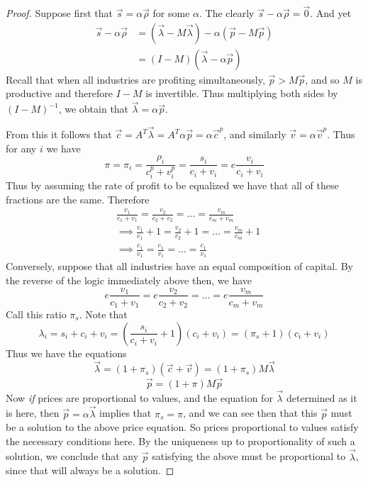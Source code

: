 \documentclass{article}
\theoremstyle{definition}
\theoremstyle{plain}
\theoremstyle{theorem}
\begin{document}
\begin{proof}
	Suppose first that $\vec{s} = \alpha\vec{\rho}$ for some $\alpha$. The clearly $\vec{s} - \alpha\vec{\rho} = \vec{0}$. And yet
	\begin{align*}
		\vec{s} - \alpha\vec{\rho} &= (\vec{\lambda} - M\vec{\lambda}) - \alpha(\vec{p} - M\vec{p}) \\
		&= (I-M)(\vec{\lambda} - \alpha\vec{p})
	\end{align*}
Recall that when all industries are profiting simultaneously, $\vec{p} > M\vec{p}$, and so $M$ is productive and therefore $I-M$ is invertible. Thus multiplying both sides by $(I-M)^{-1}$, we obtain that $\vec{\lambda} = \alpha\vec{p}$. \par 
From this it follows that $\vec{c} = A^T\vec{\lambda} = A^T\alpha\vec{p} = \alpha\vec{c}^p$, and similarly $\vec{v} = \alpha\vec{v}^p$. Thus for any $i$ we have
\[ \pi = \pi_i = \frac{\rho_i}{c_i^p + v_i^p} = \frac{s_i}{c_i+v_i} = e\frac{v_i}{c_i+v_i} \]
Thus by assuming the rate of profit to be equalized we have that all of these fractions are the same. Therefore 
\begin{align*}
	& \frac{v_1}{c_1+v_1} = \frac{v_2}{c_2+v_2} = \ldots = \frac{v_m}{c_m+v_m} \\
	&\implies \frac{v_1}{c_1}+1 = \frac{v_2}{c_2}+1 = \ldots = \frac{v_m}{c_m}+1 \\
	&\implies \frac{c_1}{v_1} = \frac{c_1}{v_1} = \ldots = \frac{c_1}{v_1}
\end{align*}
Conversely, suppose that all industries have an equal composition of capital. By the reverse of the logic immediately above then, we have
\[ e\frac{v_1}{c_1+v_1} = e\frac{v_2}{c_2+v_2} = \ldots = e\frac{v_m}{c_m+v_m} \]
Call this ratio $\pi_s$. Note that
\[ \lambda_i = s_i + c_i + v_i = (\frac{s_i}{c_i+v_i} + 1)(c_i+v_i) = (\pi_s+1)(c_i+v_i) \]
Thus we have the equations
\[ \vec{\lambda} = (1+\pi_s)(\vec{c} + \vec{v}) = (1+\pi_s)M\vec{\lambda} \]
\[ \vec{p} = (1+\pi)M\vec{p} \]
Now \textit{if} prices are proportional to values, and the equation for $\vec{\lambda}$ determined as it is here, then $\vec{p} = \alpha\vec{\lambda}$ implies that $\pi_s = \pi$, and we can see then that this $\vec{p}$ must be a solution to the above price equation. So prices proportional to values satisfy the necessary conditions here. By the uniqueness up to proportionality of such a solution, we conclude that any $\vec{p}$ satisfying the above must be proportional to $\vec{\lambda}$, since that will always be a solution. 
\end{proof}
\end{document}
